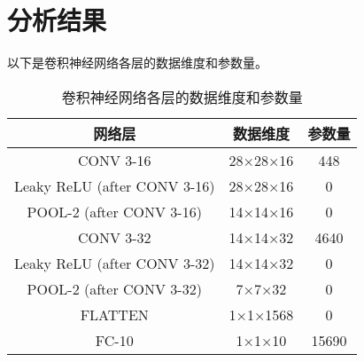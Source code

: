 \section{分析结果}\label{sec:results}

以下是卷积神经网络各层的数据维度和参数量。

\begin{table}[!hpt]
  \caption{卷积神经网络各层的数据维度和参数量}
  \centering
  \begin{tabular}{ccc} \toprule
    \textbf{网络层} & \textbf{数据维度} & \textbf{参数量} \\ \midrule
    CONV 3-16 & 28×28×16 & 448 \\
    Leaky ReLU (after CONV 3-16) & 28×28×16 & 0 \\
    POOL-2 (after CONV 3-16) & 14×14×16 & 0 \\
    CONV 3-32 & 14×14×32 & 4640 \\
    Leaky ReLU (after CONV 3-32) & 14×14×32 & 0 \\
    POOL-2 (after CONV 3-32) & 7×7×32 & 0 \\
    FLATTEN & 1×1×1568 & 0 \\
    FC-10 & 1×1×10 & 15690 \\ \bottomrule
  \end{tabular}
\end{table}